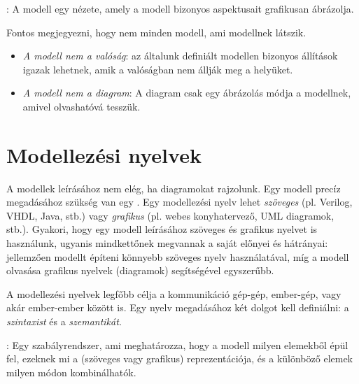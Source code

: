\begin{definicio}
	: A modell egy nézete, amely a modell bizonyos aspektusait grafikusan ábrázolja.
\end{definicio}

\begin{megjegyzes}
Fontos megjegyezni, hogy nem minden modell, ami modellnek látszik.

\begin{itemize}
	\item \emph{A modell nem a valóság}: az általunk definiált modellen bizonyos állítások igazak lehetnek, amik a valóságban nem állják meg a helyüket.
	\item \emph{A modell nem a diagram}: A diagram csak egy ábrázolás módja a modellnek, amivel olvashatóvá tesszük. 
\end{itemize}
\end{megjegyzes}


\section{Modellezési nyelvek}

A modellek leírásához nem elég, ha diagramokat rajzolunk. Egy modell precíz megadásához szükség van egy . Egy modellezési nyelv lehet \emph{szöveges} (pl. Verilog, VHDL, Java, stb.) vagy \emph{grafikus} (pl. webes konyhatervező, UML diagramok, stb.). Gyakori, hogy egy modell leírásához szöveges és grafikus nyelvet is használunk, ugyanis mindkettőnek megvannak a saját előnyei és hátrányai: jellemzően modellt építeni könnyebb szöveges nyelv használatával, míg a modell olvasása grafikus nyelvek (diagramok) segítségével egyszerűbb.

A modellezési nyelvek legfőbb célja a kommunikáció gép-gép, ember-gép, vagy akár ember-ember között is. Egy nyelv megadásához két dolgot kell definiálni: a \emph{szintaxist} és a \emph{szemantikát}.


\begin{definicio}
	: Egy szabályrendszer, ami meghatározza, hogy a modell milyen elemekből épül fel, ezeknek mi a (szöveges vagy grafikus) reprezentációja, és a különböző elemek milyen módon kombinálhatók.
\end{definicio}

